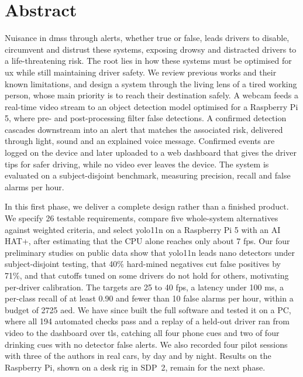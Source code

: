 \documentclass[12pt]{report}
\begin{document}
\chapter*{Abstract}

Nuisance in \glspl{dms} through alerts, whether true or false, leads drivers to disable, circumvent and distrust these systems, exposing drowsy and distracted drivers to a life-threatening risk. The root lies in how these systems must be optimised for \gls{ux} while still maintaining driver safety. We review previous works and their known limitations, and design a system through the living lens of a tired working person, whose main priority is to reach their destination safely. A webcam feeds a real-time video stream to an object detection model optimised for a Raspberry Pi 5, where pre- and post-processing filter false detections. A confirmed detection cascades downstream into an alert that matches the associated risk, delivered through light, sound and an explained voice message. Confirmed events are logged on the device and later uploaded to a web dashboard that gives the driver tips for safer driving, while no video ever leaves the device. The system is evaluated on a subject-disjoint benchmark, measuring precision, recall and false alarms per hour.

In this first phase, we deliver a complete design rather than a finished product. We specify 26 testable requirements, compare five whole-system alternatives against weighted criteria, and select \gls{yolo}11n on a Raspberry Pi 5 with an AI HAT+, after estimating that the CPU alone reaches only about 7 \gls{fps}. Our four preliminary studies on public data show that \gls{yolo}11n leads nano detectors under subject-disjoint testing, that 40\% hard-mined negatives cut false positives by 71\%, and that cutoffs tuned on some drivers do not hold for others, motivating per-driver calibration. The targets are 25 to 40 \gls{fps}, a latency under 100 ms, a per-class recall of at least 0.90 and fewer than 10 false alarms per hour, within a budget of 2725 \gls{aed}. We have since built the full software and tested it on a PC, where all 194 automated checks pass and a replay of a held-out driver ran from video to the dashboard over \gls{tls}, catching all four phone cues and two of four drinking cues with no detector false alerts. We also recorded four pilot sessions with three of the authors in real cars, by day and by night. Results on the Raspberry Pi, shown on a desk rig in SDP~2, remain for the next phase.
\end{document}

